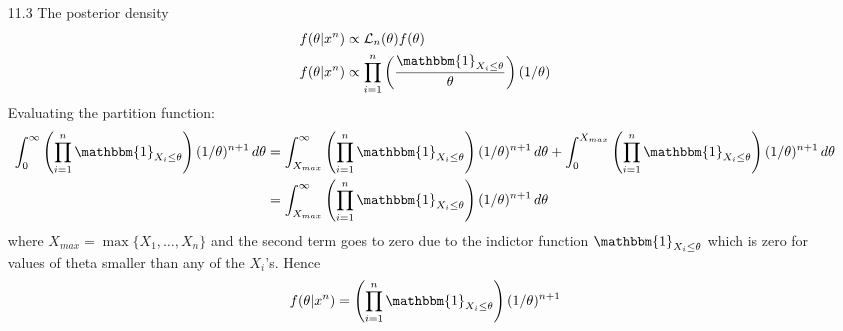 \documentclass[a4paper,10pt]{article}
\theoremstyle{definition}
\begin{document}
\begin{enumerate}
\item[11.3] The posterior density 
\begin{align*}
f(\theta|x^n) &\propto \mathcal{L}_n(\theta)f(\theta)\\
f(\theta|x^n) &\propto \prod_{i=1}^{n}\left(\frac{\mathbbm{1}_{X_i \leq \theta}}{\theta}\right)(1/\theta)
\end{align*}
Evaluating the partition function:
\begin{align*}
\int_{0}^{\infty}\left(\prod_{i=1}^{n}\mathbbm{1}_{X_i \leq \theta}\right)(1/\theta)^{n+1}\,d\theta &= \int_{X_{max}}^{\infty}\left(\prod_{i=1}^{n}\mathbbm{1}_{X_i \leq \theta}\right)(1/\theta)^{n+1}\,d\theta + \int^{X_{max}}_{0}\left(\prod_{i=1}^{n}\mathbbm{1}_{X_i \leq \theta}\right)(1/\theta)^{n+1}\,d\theta\\
&=\int_{X_{max}}^{\infty}\left(\prod_{i=1}^{n}\mathbbm{1}_{X_i \leq \theta}\right)(1/\theta)^{n+1}\,d\theta
\end{align*}
where $X_{max} = \max \{X_1, \ldots, X_n\}$ and the second term goes to zero due to the indictor function $\mathbbm{1}_{X_i \leq \theta}$ which is zero for values of theta smaller than any of the $X_i$'s. Hence 
\begin{align*}
f(\theta | x^n) = \left(\prod_{i=1}^{n}\mathbbm{1}_{X_i \leq \theta}\right)(1/\theta)^{n+1}
\end{align*}




\end{enumerate}
\end{document}
